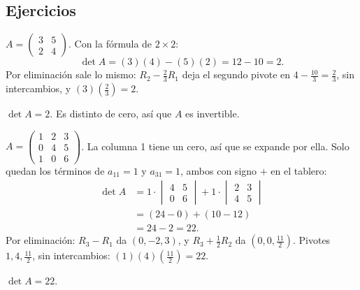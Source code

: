 \documentclass[11pt,letterpaper]{article}
\begin{document}
\subsection*{Ejercicios}

\begin{ejemplo}[Ejercicio 1]
    $A = \begin{pmatrix} 3 & 5 \\ 2 & 4 \end{pmatrix}$. Con la fórmula
    de $2 \times 2$:
    \[
        \det A = (3)(4) - (5)(2) = 12 - 10 = 2 .
    \]
    Por eliminación sale lo mismo: $R_2 - \tfrac{2}{3}R_1$ deja el
    segundo pivote en $4 - \tfrac{10}{3} = \tfrac{2}{3}$, sin
    intercambios, y $(3)(\tfrac{2}{3}) = 2$.
\end{ejemplo}

\begin{resultado}
    $\det A = 2$. Es distinto de cero, así que $A$ es invertible.
\end{resultado}

\begin{ejemplo}[Ejercicio 2]
    $A = \begin{pmatrix} 1 & 2 & 3 \\ 0 & 4 & 5 \\ 1 & 0 & 6
    \end{pmatrix}$. La columna 1 tiene un cero, así que se expande por
    ella. Solo quedan los términos de $a_{11} = 1$ y $a_{31} = 1$,
    ambos con signo $+$ en el tablero:
    \begin{align*}
        \det A
        &= 1 \cdot \begin{vmatrix} 4 & 5 \\ 0 & 6 \end{vmatrix}
         + 1 \cdot \begin{vmatrix} 2 & 3 \\ 4 & 5 \end{vmatrix} \\
        &= (24 - 0) + (10 - 12) \\
        &= 24 - 2 = 22 .
    \end{align*}
    Por eliminación: $R_3 - R_1$ da $(0, -2, 3)$, y
    $R_3 + \tfrac{1}{2}R_2$ da $(0, 0, \tfrac{11}{2})$. Pivotes
    $1, 4, \tfrac{11}{2}$, sin intercambios:
    $(1)(4)(\tfrac{11}{2}) = 22$.
\end{ejemplo}

\begin{resultado}
    $\det A = 22$.
\end{resultado}
\end{document}
